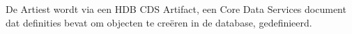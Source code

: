             De Artiest wordt via een HDB CDS Artifact, een Core Data Services document dat definities bevat om objecten te creëren in de database, gedefinieerd.
